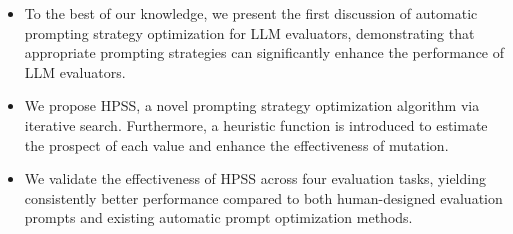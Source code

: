\begin{itemize}
    \item To the best of our knowledge, we present the first discussion of automatic prompting strategy optimization for LLM evaluators, demonstrating that appropriate prompting strategies can significantly enhance the performance of LLM evaluators.
    \item We propose HPSS, a novel prompting strategy optimization algorithm via iterative search. 
    Furthermore, a heuristic function is introduced to estimate the prospect of each value and enhance the effectiveness of mutation.
    \item We validate the effectiveness of HPSS across four evaluation tasks, yielding consistently better performance compared to both human-designed evaluation prompts and existing automatic prompt optimization methods.
\end{itemize}
